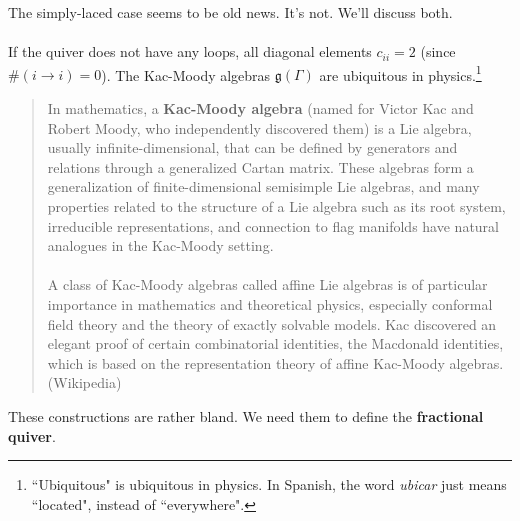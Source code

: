 \documentclass[12pt]{article}
\begin{document}
The simply-laced case seems to be old news.  It's not.  We'll discuss both. \\ \\
If the quiver does not have any loops, all diagonal elements $c_{ii} = 2$ (since $\# (i \to i) = 0$).  The Kac-Moody algebras $\mathfrak{g}(\Gamma)$ are ubiquitous in physics.\footnote{``Ubiquitous" is ubiquitous in physics.  In Spanish, the word \textit{ubicar} just means ``located", instead of ``everywhere".} 
\selectfont \fontsize{10}{15}\selectfont
\begin{quotation}
In mathematics, a \textbf{Kac-Moody algebra} (named for {\color{green!50!white!80!black}Victor Kac} and {\color{blue!50!white}Robert Moody}, who independently discovered them) is a Lie algebra, usually infinite-dimensional, that can be defined by generators and relations through a generalized Cartan matrix. These algebras form a generalization of finite-dimensional semisimple Lie algebras, and many properties related to the structure of a Lie algebra such as its root system, irreducible representations, and connection to flag manifolds have natural analogues in the Kac-Moody setting. \\ \\
A class of Kac-Moody algebras called affine Lie algebras is of particular importance in mathematics and theoretical physics, especially conformal field theory and the theory of exactly solvable models. Kac discovered an elegant proof of certain combinatorial identities, the Macdonald identities, which is based on the representation theory of affine Kac-Moody algebras. \hfill (Wikipedia)
\end{quotation}
\selectfont \fontsize{12.5}{15}\selectfont
These constructions are rather bland.  We need them to define the \textbf{fractional quiver}.
\newpage
\end{document}
